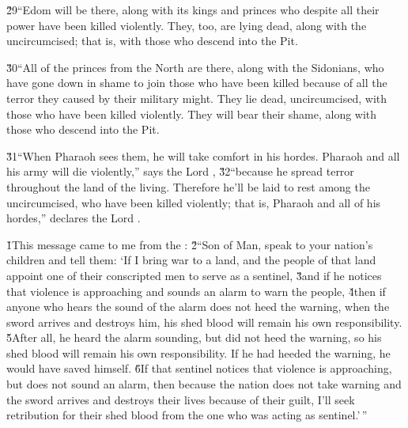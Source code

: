 \v{29}``Edom will be there, along with its kings and princes who despite all their power have been killed violently. They, too, are lying dead, along with the uncircumcised; that is, with those who descend into the Pit.

\v{30}``All of the princes from the North are there, along with the Sidonians, who have gone down in shame to join those who have been killed because of all the terror they caused by their military might. They lie dead, uncircumcised, with those who have been killed violently. They will bear their shame, along with those who descend into the Pit.

\v{31}``When Pharaoh sees them, he will take comfort in his hordes. Pharaoh and all his army will die violently,'' says the Lord , \v{32}``because he spread terror throughout the land of the living. Therefore he'll be laid to rest among the uncircumcised, who have been killed violently; that is, Pharaoh and all of his hordes,'' declares the Lord .

\v{1}This message came to me from the : \v{2}``Son of Man, speak to your nation's children and tell them: `If I bring war to a land, and the people of that land appoint one of their conscripted men to serve as a sentinel, \v{3}and if he notices that violence is approaching and sounds an alarm to warn the people, \v{4}then if anyone who hears the sound of the alarm does not heed the warning, when the sword arrives and destroys him, his shed blood will remain his own responsibility. \v{5}After all, he heard the alarm sounding, but did not heed the warning, so his shed blood will remain his own responsibility. If he had heeded the warning, he would have saved himself. \v{6}If that sentinel notices that violence is approaching, but does not sound an alarm, then because the nation does not take warning and the sword arrives and destroys their lives because of their guilt, I'll seek retribution for their shed blood from the one who was acting as sentinel.'\,''

